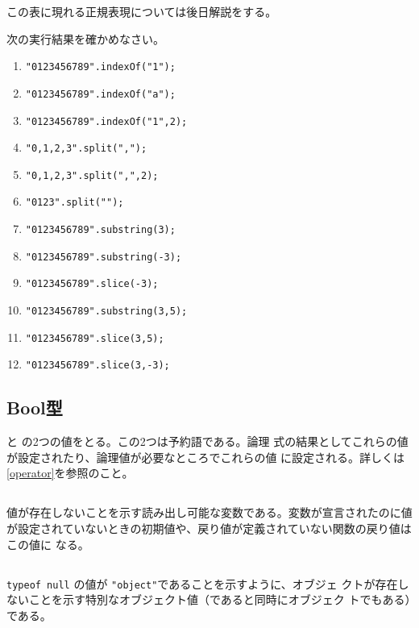 この表に現れる正規表現については後日解説をする。
\begin{Exec}\upshape
 次の実行結果を確かめなさい。
 \begin{enumerate}
	\item \texttt{"0123456789".indexOf("1");}
	\item \texttt{"0123456789".indexOf("a");}
	\item \texttt{"0123456789".indexOf("1",2);}
	\item \texttt{"0,1,2,3".split(",");}
	\item \texttt{"0,1,2,3".split(",",2);}
	\item \texttt{"0123".split("");}
	\item \texttt{"0123456789".substring(3);}
	\item \texttt{"0123456789".substring(-3);}
	\item \texttt{"0123456789".slice(-3);}
	\item \texttt{"0123456789".substring(3,5);}
	\item \texttt{"0123456789".slice(3,5);}
	\item \texttt{"0123456789".slice(3,-3);}
 \end{enumerate}
\end{Exec}
\iffalse
\begin{Prob}\upshape
 与えられた文字列の最後の3つの部分の文字列を得る(文字列
 \texttt{"0123456789"}に対しては\texttt{"789"}を返す)ためにはどのようにすれば
 よいか。
\end{Prob}
\fi
  \subsection{Bool型}
 と  の2つの値をとる。この2つは予約語である。論理
式の結果としてこれらの値が設定されたり、論理値が必要なところでこれらの値
に設定される。詳しくは\ref{operator}を参照のこと。
\subsection{\protect{}}
値が存在しないことを示す読み出し可能な変数である。変数が宣言されたのに値
が設定されていないときの初期値や、戻り値が定義されていない関数の戻り値はこの値に
なる。
\subsection{\protect{}}
\Verb+typeof null+ の値が \Verb+"object"+であることを示すように、オブジェ
クトが存在しないことを示す特別なオブジェクト値（であると同時にオブジェク
トでもある）である。

